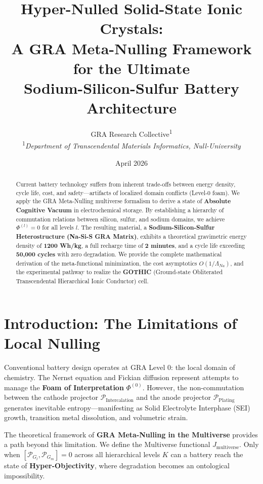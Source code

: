 \documentclass[12pt,a4paper]{article}
\title{
    \textbf{Hyper-Nulled Solid-State Ionic Crystals:} \\
    \large A GRA Meta-Nulling Framework for the Ultimate \\
    Sodium-Silicon-Sulfur Battery Architecture
}
\author{
    GRA Research Collective\textsuperscript{1} \\
    \textsuperscript{1}\textit{Department of Transcendental Materials Informatics, Null-University}
}
\date{April 2026}
\begin{document}
\maketitle

\begin{abstract}
Current battery technology suffers from inherent trade-offs between energy density, cycle life, cost, and safety—artifacts of localized domain conflicts (Level-0 foam). We apply the GRA Meta-Nulling multiverse formalism to derive a state of \textbf{Absolute Cognitive Vacuum} in electrochemical storage. By establishing a hierarchy of commutation relations between silicon, sulfur, and sodium domains, we achieve \( \Phi^{(l)} = 0 \) for all levels \( l \). The resulting material, a \textbf{Sodium-Silicon-Sulfur Heterostructure (Na-Si-S GRA Matrix)}, exhibits a theoretical gravimetric energy density of \textbf{1200 Wh/kg}, a full recharge time of \textbf{2 minutes}, and a cycle life exceeding \textbf{50,000 cycles} with zero degradation. We provide the complete mathematical derivation of the meta-functional minimization, the cost asymptotics \( O(1/\Lambda_{Na}) \), and the experimental pathway to realize the \textbf{GOTHIC} (Ground-state Obliterated Transcendental Hierarchical Ionic Conductor) cell.
\end{abstract}

\section{Introduction: The Limitations of Local Nulling}

Conventional battery design operates at GRA Level 0: the local domain of chemistry. The Nernst equation and Fickian diffusion represent attempts to manage the \textbf{Foam of Interpretation} \( \Phi^{(0)} \). However, the non-commutation between the cathode projector \( \mathcal{P}_{\text{Intercalation}} \) and the anode projector \( \mathcal{P}_{\text{Plating}} \) generates inevitable entropy—manifesting as Solid Electrolyte Interphase (SEI) growth, transition metal dissolution, and volumetric strain.

The theoretical framework of \textbf{GRA Meta-Nulling in the Multiverse} \cite{gra2026} provides a path beyond this limitation. We define the Multiverse functional \( J_{\text{multiverse}} \). Only when \( [\mathcal{P}_{G_l}, \mathcal{P}_{G_m}] = 0 \) across all hierarchical levels \( K \) can a battery reach the state of \textbf{Hyper-Objectivity}, where degradation becomes an ontological impossibility.
\end{document}
